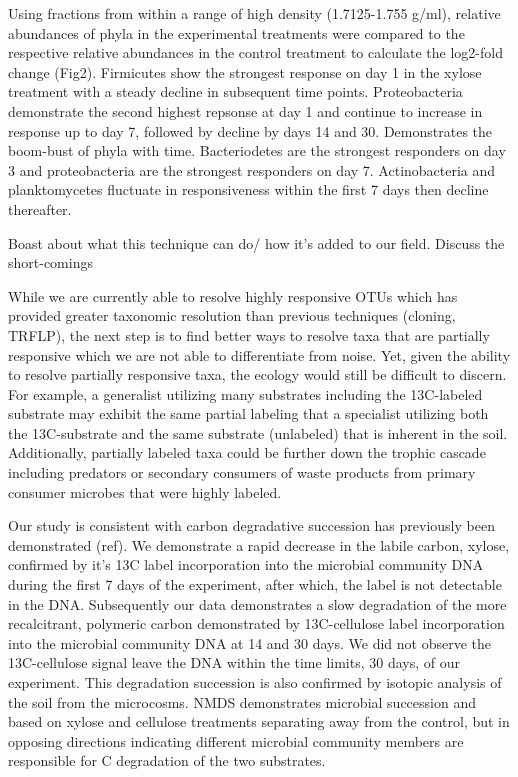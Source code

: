 Using fractions from within a range of high density (1.7125-1.755 g/ml), relative abundances of phyla in the experimental treatments were compared to the respective relative abundances in the control treatment to calculate the log2-fold change (Fig2).  Firmicutes show the strongest response on day 1 in the xylose treatment with a steady decline in subsequent time points.  Proteobacteria demonstrate the second highest repsonse at day 1 and continue to increase in response up to day 7, followed by decline by days 14 and 30.  Demonstrates the boom-bust of phyla with time.  Bacteriodetes are the strongest responders on day 3 and proteobacteria are the strongest responders on day 7.  Actinobacteria and planktomycetes fluctuate in responsiveness within the first 7 days then decline thereafter.          
 

 
Boast about what this technique can do/ how it's added to our field.
Discuss the short-comings


While we are currently able to resolve highly responsive OTUs which has provided greater taxonomic resolution than previous techniques (cloning, TRFLP), the next step is to find better ways to resolve taxa that are partially responsive which we are not able to differentiate from noise.  Yet, given the ability to resolve partially responsive taxa, the ecology would still be difficult to discern.  For example, a generalist utilizing many substrates including the 13C-labeled substrate may exhibit the same partial labeling that a specialist utilizing both the 13C-substrate and the same substrate (unlabeled) that is inherent in the soil. Additionally, partially labeled taxa could be further down the trophic cascade including predators or secondary consumers of waste products from primary consumer microbes that were highly labeled.     


Our study is consistent with carbon degradative succession has previously been demonstrated (ref). We demonstrate a rapid decrease in the labile carbon, xylose, confirmed by it’s 13C label incorporation into the microbial community DNA during the first 7 days of the experiment, after which, the label is not detectable in the DNA. Subsequently our data demonstrates a slow degradation of the more recalcitrant, polymeric carbon demonstrated by 13C-cellulose label incorporation into the microbial community DNA at 14 and 30 days.  We did not observe the 13C-cellulose signal leave the DNA within the time limits, 30 days, of our experiment.  This degradation succession is also confirmed by isotopic analysis of the soil from the microcosms.  NMDS demonstrates microbial succession and based on xylose and cellulose treatments separating away from the control, but in opposing directions indicating different microbial community members are responsible for C degradation of the two substrates. 

